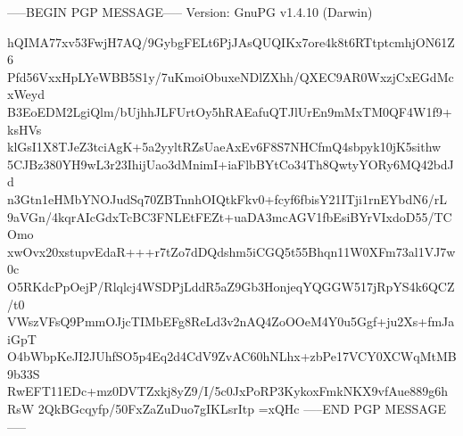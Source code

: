 -----BEGIN PGP MESSAGE-----
Version: GnuPG v1.4.10 (Darwin)

hQIMA77xv53FwjH7AQ/9GybgFELt6PjJAsQUQIKx7ore4k8t6RTtptcmhjON61Z6
Pfd56VxxHpLYeWBB5S1y/7uKmoiObuxeNDlZXhh/QXEC9AR0WxzjCxEGdMcxWeyd
B3EoEDM2LgiQlm/bUjhhJLFUrtOy5hRAEafuQTJlUrEn9mMxTM0QF4W1f9+ksHVs
klGsI1X8TJeZ3tciAgK+5a2yyltRZsUaeAxEv6F8S7NHCfmQ4sbpyk10jK5sithw
5CJBz380YH9wL3r23IhijUao3dMnimI+iaFlbBYtCo34Th8QwtyYORy6MQ42bdJd
n3Gtn1eHMbYNOJudSq70ZBTnnhOIQtkFkv0+fcyf6fbisY21ITji1rnEYbdN6/rL
9aVGn/4kqrAIcGdxTcBC3FNLEtFEZt+uaDA3mcAGV1fbEsiBYrVIxdoD55/TCOmo
xwOvx20xstupvEdaR+++r7tZo7dDQdshm5iCGQ5t55Bhqn11W0XFm73al1VJ7w0c
O5RKdcPpOejP/Rlqlcj4WSDPjLddR5aZ9Gb3HonjeqYQGGW517jRpYS4k6QCZ/t0
VWszVFsQ9PmmOJjcTIMbEFg8ReLd3v2nAQ4ZoOOeM4Y0u5Ggf+ju2Xs+fmJaiGpT
O4bWbpKeJI2JUhfSO5p4Eq2d4CdV9ZvAC60hNLhx+zbPe17VCY0XCWqMtMB9b33S
RwEFT11EDc+mz0DVTZxkj8yZ9/I/5c0JxPoRP3KykoxFmkNKX9vfAue889g6hRsW
2QkBGcqyfp/50FxZaZuDuo7gIKLsrItp
=xQHc
-----END PGP MESSAGE-----
